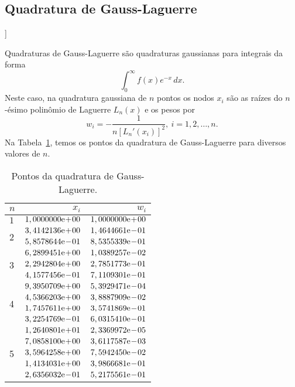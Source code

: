 \subsection{Quadratura de Gauss-Laguerre}

\begin{flushleft}
  [[tag:revisar]]
\end{flushleft}

Quadraturas de Gauss-Laguerre são quadraturas gaussianas para integrais da forma
\begin{equation}
  \int_{0}^\infty f(x)e^{-x}\,dx.
\end{equation}
Neste caso, na quadratura gaussiana de $n$ pontos os nodos $x_i$ são as raízes do $n$-ésimo polinômio de Laguerre $L_n(x)$ e os pesos por
\begin{equation}
  w_i = -\frac{1}{n[L_n'(x_i)]^2},~i=1, 2, \dotsc, n.
\end{equation}
Na Tabela~\ref{tab:quad_GLa}, temos os pontos da quadratura de Gauss-Laguerre para diversos valores de $n$.

\begin{table}[h!]
  \centering
  \caption{Pontos da quadratura de Gauss-Laguerre.}
  \begin{tabular}{lrr}
    $n$ & $x_i$ & $w_i$ \\\hline
    $1$ & $1,0000000\mathrm{e}\!+\!00$ & $1,0000000\mathrm{e}\!+\!00$ \\\hline
    \multirow{2}{*}{2}
        & $3,4142136\mathrm{e}\!+\!00$ & $1,4644661\mathrm{e}\!-\!01$ \\
        & $5,8578644\mathrm{e}\!-\!01$ & $8,5355339\mathrm{e}\!-\!01$ \\\hline
    \multirow{3}{*}{3}
        & $6,2899451\mathrm{e}\!+\!00$ & $1,0389257\mathrm{e}\!-\!02$ \\
        & $2,2942804\mathrm{e}\!+\!00$ & $2,7851773\mathrm{e}\!-\!01$ \\
        & $4,1577456\mathrm{e}\!-\!01$ & $7,1109301\mathrm{e}\!-\!01$ \\\hline
    \multirow{4}{*}{4}
        & $9,3950709\mathrm{e}\!+\!00$ & $5,3929471\mathrm{e}\!-\!04$ \\
        & $4,5366203\mathrm{e}\!+\!00$ & $3,8887909\mathrm{e}\!-\!02$ \\
        & $1,7457611\mathrm{e}\!+\!00$ & $3,5741869\mathrm{e}\!-\!01$ \\
        & $3,2254769\mathrm{e}\!-\!01$ & $6,0315410\mathrm{e}\!-\!01$ \\\hline
    \multirow{5}{*}{5}
        & $1,2640801\mathrm{e}\!+\!01$ & $2,3369972\mathrm{e}\!-\!05$ \\
        & $7,0858100\mathrm{e}\!+\!00$ & $3,6117587\mathrm{e}\!-\!03$ \\
        & $3,5964258\mathrm{e}\!+\!00$ & $7,5942450\mathrm{e}\!-\!02$ \\
        & $1,4134031\mathrm{e}\!+\!00$ & $3,9866681\mathrm{e}\!-\!01$ \\
        & $2,6356032\mathrm{e}\!-\!01$ & $5,2175561\mathrm{e}\!-\!01$ \\\hline
  \end{tabular}
  \label{tab:quad_GLa}
\end{table}

